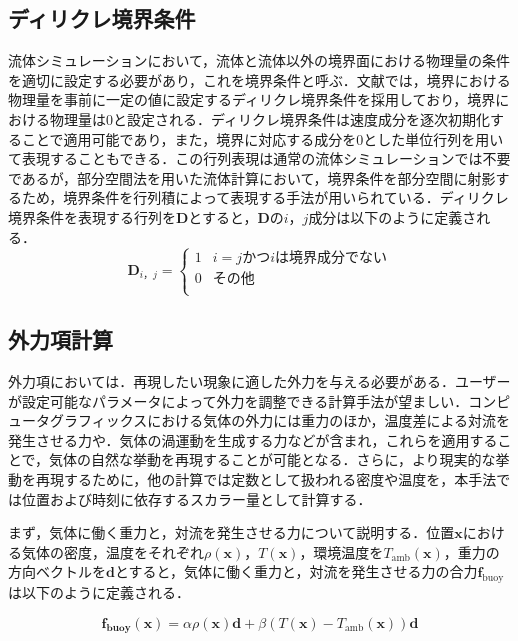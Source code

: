\documentclass[a4j,12pt]{jreport}
\begin{document}
\subsection{ディリクレ境界条件}
流体シミュレーションにおいて，流体と流体以外の境界面における物理量の条件を適切に設定する必要があり，これを境界条件と呼ぶ．文献\cite{fedkiw}では，境界における物理量を事前に一定の値に設定するディリクレ境界条件を採用しており，境界における物理量は$0$と設定される．ディリクレ境界条件は速度成分を逐次初期化することで適用可能であり，また，境界に対応する成分を$0$とした単位行列を用いて表現することもできる．この行列表現は通常の流体シミュレーションでは不要であるが，部分空間法を用いた流体計算において，境界条件を部分空間に射影するため，境界条件を行列積によって表現する手法が用いられている．ディリクレ境界条件を表現する行列を$\bm{D}$とすると，$\bm{D}$の$i，j$成分は以下のように定義される．
\begin{equation}
	\bm{D}_{i，j} = \begin{cases}
 	1 	& i = j かつ iは境界成分でない\\
 	0  		& その他\\
 \end{cases}
\end{equation}


\subsection{外力項計算}
外力項においては．再現したい現象に適した外力を与える必要がある．ユーザーが設定可能なパラメータによって外力を調整できる計算手法が望ましい．コンピュータグラフィックスにおける気体の外力には重力のほか，温度差による対流を発生させる力や．気体の渦運動を生成する力などが含まれ，これらを適用することで，気体の自然な挙動を再現することが可能となる．さらに，より現実的な挙動を再現するために，他の計算では定数として扱われる密度や温度を，本手法では位置および時刻に依存するスカラー量として計算する．

まず，気体に働く重力と，対流を発生させる力について説明する．位置$\bm{x}$における気体の密度，温度をそれぞれ$\rho(\bm{x})$，$T(\bm{x})$，環境温度を$T_{\text{amb}}(\bm{x})$，重力の方向ベクトルを$\bm{d}$とすると，気体に働く重力と，対流を発生させる力の合力$\bm{f}_{\text{buoy}}$は以下のように定義される．

\begin{equation}\label{eq:buoyancy}
	\bm{f_{\text{buoy}}(\bm{x})} =  \alpha \rho(\bm{x})\bm{d}+ \beta(T(\bm{x})- T_{\text{amb}}(\bm{x}))\bm{d}
\end{equation} 
\end{document}
